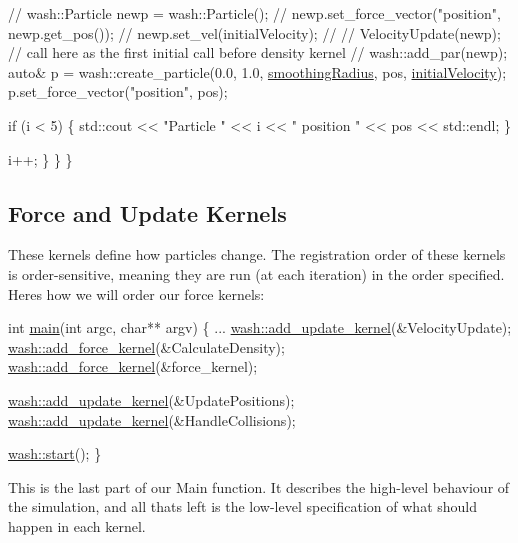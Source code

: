 \begin{DoxyCode}
            \textcolor{comment}{// wash::Particle newp = wash::Particle();}
            \textcolor{comment}{// newp.set\_force\_vector("position", newp.get\_pos());}
            \textcolor{comment}{// newp.set\_vel(initialVelocity);}
            \textcolor{comment}{// // VelocityUpdate(newp); // call here as the first initial call before density kernel}
            \textcolor{comment}{// wash::add\_par(newp);}
            \textcolor{keyword}{auto}& p = wash::create\_particle(0.0, 1.0, \mbox{\hyperlink{3d__fluid__sim_2fluid__sim_8cpp_aeb9760a781fb6ccf134ed4353c9888e5}{smoothingRadius}}, pos, 
      \mbox{\hyperlink{ca__fluid__sim_2fluid__sim_8cpp_ab15a76f258cadefcad1f4b39a8e76618}{initialVelocity}});
            p.set\_force\_vector(\textcolor{stringliteral}{"position"}, pos);

            \textcolor{keywordflow}{if} (i < 5) \{
                std::cout << \textcolor{stringliteral}{"Particle "} << i << \textcolor{stringliteral}{" position "} << pos << std::endl;
            \}

            i++;
        \}
    \}
\}
\end{DoxyCode}


\subsection*{Force and Update Kernels}

These kernels define how particles change. The registration order of these kernels is order-\/sensitive, meaning they are run (at each iteration) in the order specified. Here\textquotesingle{}s how we will order our force kernels\+: 
\begin{DoxyCode}
\textcolor{keywordtype}{int} \mbox{\hyperlink{3d__fluid__sim_2fluid__sim_8cpp_a3c04138a5bfe5d72780bb7e82a18e627}{main}}(\textcolor{keywordtype}{int} argc, \textcolor{keywordtype}{char}** argv) \{
    ...
    \mbox{\hyperlink{namespacewash_abc27c958fb1156da77a1346c3559abc1}{wash::add\_update\_kernel}}(&VelocityUpdate);
    \mbox{\hyperlink{namespacewash_a2ffa21a9e32d3ca6ce87def3e7db4837}{wash::add\_force\_kernel}}(&CalculateDensity);
    \mbox{\hyperlink{namespacewash_a2ffa21a9e32d3ca6ce87def3e7db4837}{wash::add\_force\_kernel}}(&force\_kernel);

    \mbox{\hyperlink{namespacewash_abc27c958fb1156da77a1346c3559abc1}{wash::add\_update\_kernel}}(&UpdatePositions);
    \mbox{\hyperlink{namespacewash_abc27c958fb1156da77a1346c3559abc1}{wash::add\_update\_kernel}}(&HandleCollisions);

    \mbox{\hyperlink{namespacewash_a4c8a9913a535b341da9e72826916544b}{wash::start}}();
\}
\end{DoxyCode}
 This is the last part of our Main function. It describes the high-\/level behaviour of the simulation, and all that\textquotesingle{}s left is the low-\/level specification of what should happen in each kernel.


